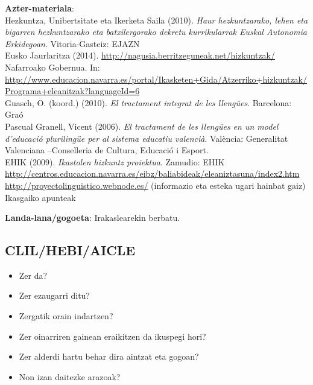 \documentclass[
]{book}
\providecommand{\tightlist}{%
  \setlength{\itemsep}{0pt}\setlength{\parskip}{0pt}}
\begin{document}
\textbf{Azter-materiala}:\\
Hezkuntza, Unibertsitate eta Ikerketa Saila (2010). \emph{Haur hezkuntzarako, lehen eta bigarren hezkuntzarako eta batxilergorako dekretu kurrikularrak Euskal Autonomia Erkidegoan}. Vitoria-Gasteiz: EJAZN\\
Eusko Jaurlaritza (2014). \url{http://nagusia.berritzeguneak.net/hizkuntzak/}\\
Nafarroako Gobernua. In: \url{http://www.educacion.navarra.es/portal/Ikasketen+Gida/Atzerriko+hizkuntzak/Programa+eleanitzak?languageId=6}\\
Guasch, O. (koord.) (2010). \emph{El tractament integrat de les llengües}. Barcelona: Graó\\
Pascual Granell, Vicent (2006). \emph{El tractament de les llengües en un model d'educació plurilingüe per al sistema educatiu valencià}. València: Generalitat Valenciana --Conselleria de Cultura, Educació i Esport.\\
EHIK (2009). \emph{Ikastolen hizkuntz proiektua}. Zamudio: EHIK\\
\url{http://centros.educacion.navarra.es/eibz/baliabideak/eleaniztasuna/index2.htm}~\\
\url{http://proyectolinguistico.webnode.es/} (informazio eta esteka ugari hainbat gaiz)\\
Ikasgaiko apunteak

\textbf{Landa-lana/gogoeta}: Irakaslearekin berbatu.

\hypertarget{clilhebiaicle}{%
\subsection*{CLIL/HEBI/AICLE}\label{clilhebiaicle}}

\begin{itemize}
\tightlist
\item
  Zer da?
\item
  Zer ezaugarri ditu?
\item
  Zergatik orain indartzen?
\item
  Zer oinarriren gainean eraikitzen da ikuspegi hori?
\item
  Zer alderdi hartu behar dira aintzat eta gogoan?
\item
  Non izan daitezke arazoak?
\end{itemize}
\end{document}
